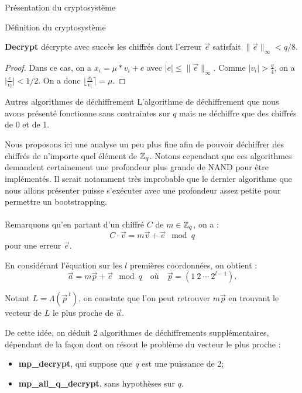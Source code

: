 \begin{section}{Présentation du cryptosystème}
\begin{subsection}{Définition du cryptosystème}
\begin{prop}
\label{dec}
\textbf{Decrypt} décrypte avec succès les chiffrés dont l'erreur $\vec{e}$ satisfait $\|\vec{e}\|_\infty < q/8$.
\end{prop}

\begin{proof}
	Dans ce cas, on a $x_i = \mu * v_i + e$ avec $\lvert e \lvert \leqslant \|\vec{e}\|_\infty$. Comme $\lvert v_i \lvert > \frac{q}{4}$, on a $\lvert \frac{e}{v_i} \lvert < 1/2$. On a donc $\lfloor \frac{x_i}{v_i} \rceil = \mu$.
\end{proof}
	\end{subsection}
	
\begin{subsection}{Autres algorithmes de déchiffrement}
	L'algorithme de déchiffrement que nous avons présenté fonctionne sans contraintes sur $q$ mais ne déchiffre que des chiffrés de 0 et de 1.

	Nous proposons ici une analyse un peu plus fine afin de pouvoir déchiffrer des chiffrés de n'importe quel élément de
	$\mathbb{Z}_q$.  Notons cependant que ces algorithmes demandent certainement une profondeur plus grande de NAND pour
	être implémentés. Il serait notamment très improbable que le dernier algorithme que nous allons présenter puisse
	s'exécuter avec une profondeur assez petite pour permettre un bootstrapping.

\paragraph{}
	Remarquons qu'en partant d'un chiffré  $C$ de $m \in \mathbb{Z}_q$, on a : \[ C \cdot \vec{v} = m \vec{v} + \vec{e} \mod
	q \] pour une erreur $\vec{e}$.
	
	En considérant l'équation sur les $l$ premières coordonnées, on obtient :
	\[\vec{a} = m \vec{p} + \vec{e} \mod q\quad \text{où}\quad \vec{p} = (1\:2\:\cdots\:2^{l-1}). \]
 
	Notant $L = \Lambda(\vec{p}^{\:t})$, on constate que l'on peut retrouver $m\vec{p}$ en trouvant le vecteur de $L$ le plus proche de $\vec{a}$.

	De cette idée, on déduit 2 algorithmes de déchiffrements supplémentaires, dépendant de la façon dont on résout le problème du vecteur le plus proche :

\begin{itemize}
\item \textbf{mp\_decrypt}, qui suppose que $q$ est une puissance de 2;
\item \textbf{mp\_all\_q\_decrypt}, sans hypothèses sur $q$.
\end{itemize}


\end{subsection}
\end{section}
